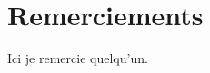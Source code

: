 \makeatletter
\@openrightfalse
\makeatother


\chapter*{Remerciements}
Ici je remercie quelqu'un.


\makeatletter
\@openrighttrue
\makeatother
